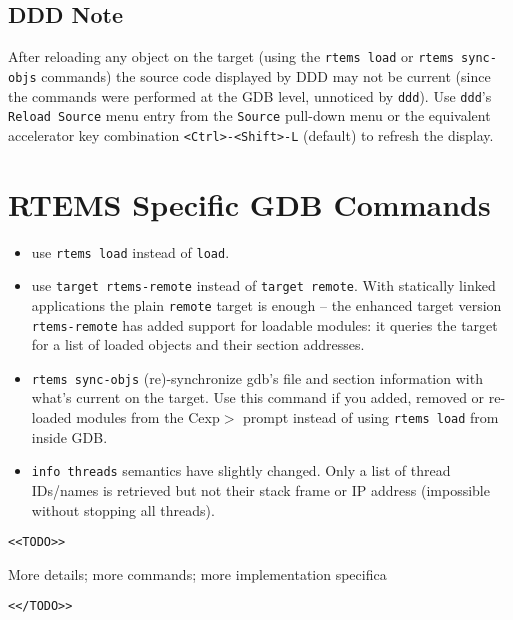 \documentclass{article}
\newcommand{\cmd}[1]{{\tt #1}}
\begin{document}
\subsection{DDD Note}
After reloading any object on the target (using the \cmd{rtems load} or
\cmd{rtems sync-objs} commands) the source code displayed
by DDD may not be current (since the commands were performed
at the GDB level, unnoticed by \cmd{ddd}).
Use \cmd{ddd}'s \cmd{Reload Source} menu entry from the
\cmd{Source} pull-down menu or the equivalent accelerator key combination
\verb|<Ctrl>-<Shift>-L| (default) to refresh the display.

\section{RTEMS Specific GDB Commands}
\begin{itemize}
\item
use \cmd{rtems load} instead of \cmd{load}.

\item
use \cmd{target rtems-remote} instead of \cmd{target remote}.
With statically linked applications the plain \cmd{remote}
target is enough -- the enhanced target version \cmd{rtems-remote} has added
support for loadable modules: it queries the target for
a list of loaded objects and their section addresses.

\item
\cmd{rtems sync-objs} (re)-synchronize gdb's file and section information
	  with what's current on the target. Use this command if you
	  added, removed or re-loaded modules from the Cexp$>$ prompt
	  instead of using \cmd{rtems load} from inside GDB.

\item
\cmd{info threads} semantics have slightly changed. Only a list
	  of thread IDs/names is retrieved but not their stack frame
	  or IP address (impossible without stopping all threads).
\end{itemize}

\verb|<<TODO>>|

	More details; more commands; more implementation specifica

\verb|<</TODO>>|
	
\end{document}
